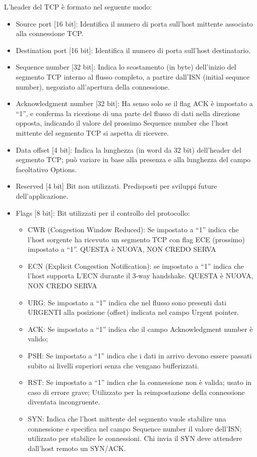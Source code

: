 L’header del TCP è formato nel seguente modo:
\begin{itemize}
\item	Source port [16 bit]: Identifica il numero di porta sull’host mittente associato alla connessione TCP.
\item	Destination port [16 bit]: Identifica il numero di porta sull’host destinatario.
\item	Sequence number [32 bit]: Indica lo scostamento (in byte) dell’inizio del segmento TCP interno al flusso completo, a partire dall’ISN (initial sequnce number), negoziato all’apertura della connessione.
\item	Acknowledgment number [32 bit]: Ha senso solo se il flag ACK è impostato a “1”, e conferma la ricezione di una parte del flusso di dati nella direzione opposta, indicando il valore del prossimo Sequence number che l’host mittente del segmento TCP si aspetta di ricevere.
\item	Data offset [4 bit]: Indica la lunghezza (in word da 32 bit) dell’header del segmento TCP; può variare in base alla presenza e alla lunghezza del campo facoltativo Options.
\item	Reserved [4 bit] Bit non utilizzati. Predisposti per sviluppi future dell’applicazione.
\item	Flags [8 bit]: Bit utilizzati per il controllo del protocollo:
\begin{itemize}
\item	CWR (Congestion Window Reduced): Se impostato a “1” indica che l’host sorgente ha ricevuto un segmento TCP con flag ECE (prossimo) impostato a “1”. 
QUESTA è NUOVA, NON CREDO SERVA
\item	ECN (Explicit Congestion Notification): se impostato a “1” indica che l’host supporta L’ECN durante il 3-way handshake. QUESTA è NUOVA, NON CREDO SERVA
\item	URG: Se impostato a “1” indica che nel flusso sono presenti dati URGENTI alla posizione (offset) indicata nel campo Urgent pointer.
\item	ACK: Se impostato a “1” indica che il campo Acknowledgment number è valido;
\item	PSH: Se impostato a “1” indica che i dati in arrivo devono essere passati subito ai livelli superiori senza che vengano bufferizzati.
\item	RST: Se impostato a “1” indica che la connessione non è valida; usato in caso di errore grave; Utilizzato per la reimpostazione della connessione diventata incongruente.
\item	SYN: Indica che l’host mittente del segmento vuole stabilire una connessione e specifica nel campo Sequence number il valore dell’ISN; utilizzato per stabilire le connessioni. Chi invia il SYN deve attendere dall’host remoto un SYN/ACK.

\end{itemize}
\end{itemize}
